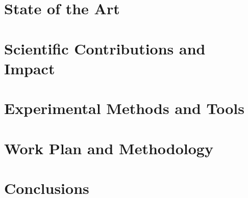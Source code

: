 \documentclass[a4paper, titlepage, 12pt]{article}
\begin{document}
\section{State of the Art}

\section{Scientific Contributions and Impact}

\section{Experimental Methods and Tools}

\newpage
\section{Work Plan and Methodology}

\section{Conclusions}

\clearpage

\renewcommand{\bibname}{\textbf{BIBLIOGRAPHY}}
\renewcommand{\refname}{\textbf{Bibliography}}
{\small 

}
\end{document}
